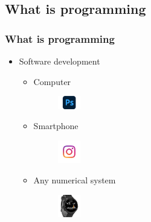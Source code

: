 \subsection{What is programming}
\begin{frame}\frametitle{What is programming}
   \begin{minipage}{0.48\linewidth}

      \begin{itemize}
         \item Software development
         \begin{itemize}
            \item Computer
            \begin{minipage}{0.2\linewidth}
               \begin{figure}[H]
                  \includegraphics[width=1cm]{../images/illustrations/photoshop.png}
               \end{figure}
            \end{minipage}
            \item Smartphone
            \begin{minipage}{0.2\linewidth}
               \begin{figure}[H]
                  \includegraphics[width=1cm]{../images/illustrations/instagram.png}
               \end{figure}
            \end{minipage}
            \item Any numerical system
            \begin{minipage}{0.15\linewidth}
               \begin{figure}[H]
                  \includegraphics[width=1cm]{../images/illustrations/montre.jpeg}
               \end{figure}
            \end{minipage}
            \hspace{2px}
            \begin{minipage}{0.2\linewidth}

\end{minipage}
\end{itemize}
\end{itemize}
\end{minipage}
\end{frame}
